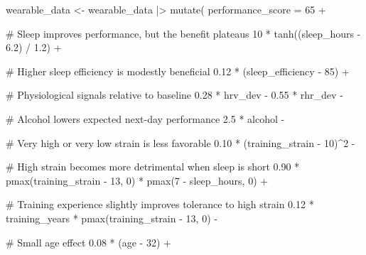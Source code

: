 \documentclass[
  letterpaper,
  DIV=11,
  numbers=noendperiod]{scrreprt}
\newenvironment{Shaded}{\begin{snugshade}}{\end{snugshade}}
\newcommand{\AttributeTok}[1]{\textcolor[rgb]{0.40,0.45,0.13}{#1}}
\newcommand{\CommentTok}[1]{\textcolor[rgb]{0.37,0.37,0.37}{#1}}
\newcommand{\DecValTok}[1]{\textcolor[rgb]{0.68,0.00,0.00}{#1}}
\newcommand{\FloatTok}[1]{\textcolor[rgb]{0.68,0.00,0.00}{#1}}
\newcommand{\FunctionTok}[1]{\textcolor[rgb]{0.28,0.35,0.67}{#1}}
\newcommand{\NormalTok}[1]{\textcolor[rgb]{0.00,0.23,0.31}{#1}}
\newcommand{\OtherTok}[1]{\textcolor[rgb]{0.00,0.23,0.31}{#1}}
\newcommand{\SpecialCharTok}[1]{\textcolor[rgb]{0.37,0.37,0.37}{#1}}
\begin{document}
\begin{Shaded}
\begin{Highlighting}[]
\NormalTok{wearable\_data }\OtherTok{\textless{}{-}}\NormalTok{ wearable\_data }\SpecialCharTok{|\textgreater{}}
  \FunctionTok{mutate}\NormalTok{(}
    \AttributeTok{performance\_score =}
      \DecValTok{65} \SpecialCharTok{+}

      \CommentTok{\# Sleep improves performance, but the benefit plateaus}
      \DecValTok{10} \SpecialCharTok{*} \FunctionTok{tanh}\NormalTok{((sleep\_hours }\SpecialCharTok{{-}} \FloatTok{6.2}\NormalTok{) }\SpecialCharTok{/} \FloatTok{1.2}\NormalTok{) }\SpecialCharTok{+}

      \CommentTok{\# Higher sleep efficiency is modestly beneficial}
      \FloatTok{0.12} \SpecialCharTok{*}\NormalTok{ (sleep\_efficiency }\SpecialCharTok{{-}} \DecValTok{85}\NormalTok{) }\SpecialCharTok{+}

      \CommentTok{\# Physiological signals relative to baseline}
      \FloatTok{0.28} \SpecialCharTok{*}\NormalTok{ hrv\_dev }\SpecialCharTok{{-}}
      \FloatTok{0.55} \SpecialCharTok{*}\NormalTok{ rhr\_dev }\SpecialCharTok{{-}}

      \CommentTok{\# Alcohol lowers expected next{-}day performance}
      \FloatTok{2.5} \SpecialCharTok{*}\NormalTok{ alcohol }\SpecialCharTok{{-}}

      \CommentTok{\# Very high or very low strain is less favorable}
      \FloatTok{0.10} \SpecialCharTok{*}\NormalTok{ (training\_strain }\SpecialCharTok{{-}} \DecValTok{10}\NormalTok{)}\SpecialCharTok{\^{}}\DecValTok{2} \SpecialCharTok{{-}}

      \CommentTok{\# High strain becomes more detrimental when sleep is short}
      \FloatTok{0.90} \SpecialCharTok{*}
        \FunctionTok{pmax}\NormalTok{(training\_strain }\SpecialCharTok{{-}} \DecValTok{13}\NormalTok{, }\DecValTok{0}\NormalTok{) }\SpecialCharTok{*}
        \FunctionTok{pmax}\NormalTok{(}\DecValTok{7} \SpecialCharTok{{-}}\NormalTok{ sleep\_hours, }\DecValTok{0}\NormalTok{) }\SpecialCharTok{+}

      \CommentTok{\# Training experience slightly improves tolerance to high strain}
      \FloatTok{0.12} \SpecialCharTok{*}
\NormalTok{        training\_years }\SpecialCharTok{*}
        \FunctionTok{pmax}\NormalTok{(training\_strain }\SpecialCharTok{{-}} \DecValTok{13}\NormalTok{, }\DecValTok{0}\NormalTok{) }\SpecialCharTok{{-}}

      \CommentTok{\# Small age effect}
      \FloatTok{0.08} \SpecialCharTok{*}\NormalTok{ (age }\SpecialCharTok{{-}} \DecValTok{32}\NormalTok{) }\SpecialCharTok{+}


\end{Highlighting}
\end{Shaded}
\end{document}
